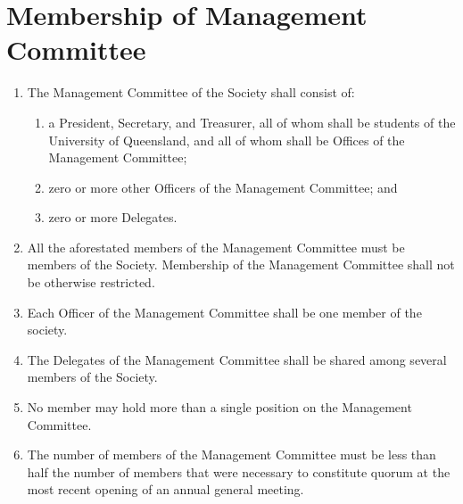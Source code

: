 \documentclass[a4paper]{article}
\begin{document}
\section{Membership of Management Committee}
\begin{enumerate}
\item The Management Committee of the Society shall consist of:
	\begin{enumerate}
	\item a President, Secretary, and Treasurer, all of whom shall be students of the University of Queensland, and all of whom shall be Offices of the Management Committee;
	\item zero or more other Officers of the Management Committee; and
	\item zero or more Delegates.
	\end{enumerate}
\item All the aforestated members of the Management Committee must be members of the Society. Membership of the Management Committee shall not be otherwise restricted.
\item Each Officer of the Management Committee shall be one member of the society.
\item The Delegates of the Management Committee shall be shared among several members of the Society.
\item No member may hold more than a single position on the Management Committee.
\item The number of members of the Management Committee must be less than half the number of members that were necessary to constitute quorum at the most recent opening of an annual general meeting.
\end{enumerate}
\end{document}
